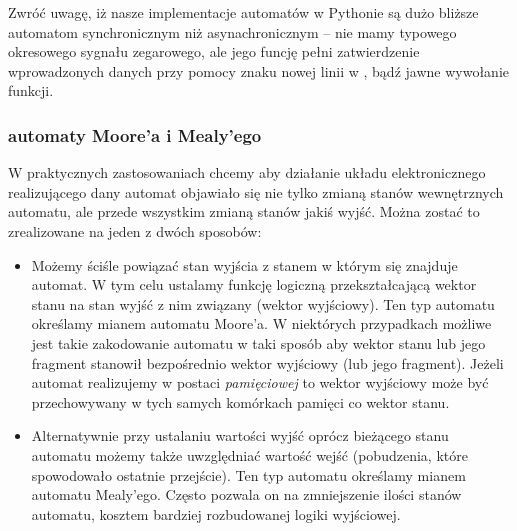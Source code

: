 \documentclass{pdfBooklets}
\begin{document}
Zwróć uwagę, iż nasze implementacje automatów w Pythonie są dużo bliższe automatom synchronicznym niż asynachronicznym – nie mamy typowego okresowego sygnału zegarowego, ale jego funcję pełni zatwierdzenie wprowadzonych danych przy pomocy znaku nowej linii w , bądź jawne wywołanie funkcji.


\subsubsection{automaty Moore'a i Mealy'ego}

W praktycznych zastosowaniach chcemy aby działanie układu elektronicznego realizującego dany automat objawiało się nie tylko zmianą stanów wewnętrznych automatu, ale przede wszystkim zmianą stanów jakiś wyjść.
Można zostać to zrealizowane na jeden z dwóch sposobów:
\begin{itemize}
\item Możemy ściśle powiązać stan wyjścia z stanem w którym się znajduje automat.
      W tym celu ustalamy funkcję logiczną przekształcającą wektor stanu na stan wyjść z nim związany (wektor wyjściowy).
      Ten typ automatu określamy mianem automatu Moore'a.
      W niektórych przypadkach możliwe jest takie zakodowanie automatu w taki sposób aby wektor stanu lub jego fragment stanowił bezpośrednio wektor wyjściowy (lub jego fragment).
      Jeżeli automat realizujemy w postaci \emph{pamięciowej} to wektor wyjściowy może być przechowywany w tych samych komórkach pamięci co wektor stanu.
\item Alternatywnie przy ustalaniu wartości wyjść oprócz bieżącego stanu automatu możemy także uwzględniać wartość wejść (pobudzenia, które spowodowało ostatnie przejście).
      Ten typ automatu określamy mianem automatu Mealy'ego.
      Często pozwala on na zmniejszenie ilości stanów automatu, kosztem bardziej rozbudowanej logiki wyjściowej.
\end{itemize}

\end{document}
